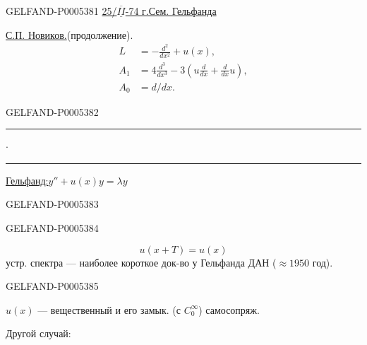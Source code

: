 \begin{GelfandAdjacentEvidence}{GELFAND-P000538}{1}
\uline{25/\mbox{$\overline{\underline{II}}$}-74 г.}\qquad\uline{Сем. Гельфанда}

\uline{С.П. Новиков.}\qquad (продолжение).
\[
\begin{aligned}
L&=-\frac{d^2}{dx^2}+u(x),\\
A_1&=4\frac{d^3}{dx^3}-3\left(u\frac d{dx}+\frac d{dx}u\right),\\
A_0&=d/dx.
\end{aligned}
\]
\end{GelfandAdjacentEvidence}
\begin{GelfandAdjacentEvidence}{GELFAND-P000538}{2}


\hfill\rule{1cm}{.35pt}\enspace\(\cdot\)\enspace\rule{1.55cm}{.35pt}\par

\uline{Гельфанд:}\quad \(y''+u(x)y=\lambda y\)
\end{GelfandAdjacentEvidence}
\begin{GelfandAdjacentEvidence}{GELFAND-P000538}{3}

\end{GelfandAdjacentEvidence}
\begin{GelfandAdjacentEvidence}{GELFAND-P000538}{4}

\[
u(x+T)=u(x)
\]
устр. спектра — наиболее короткое док-во у Гельфанда ДАН (\(\approx1950\) год).
\end{GelfandAdjacentEvidence}
\begin{GelfandAdjacentEvidence}{GELFAND-P000538}{5}


$u(x)$ — вещественный и его замык. (с \(C_0^\infty\)) самосопряж.

Другой случай:
\end{GelfandAdjacentEvidence}
